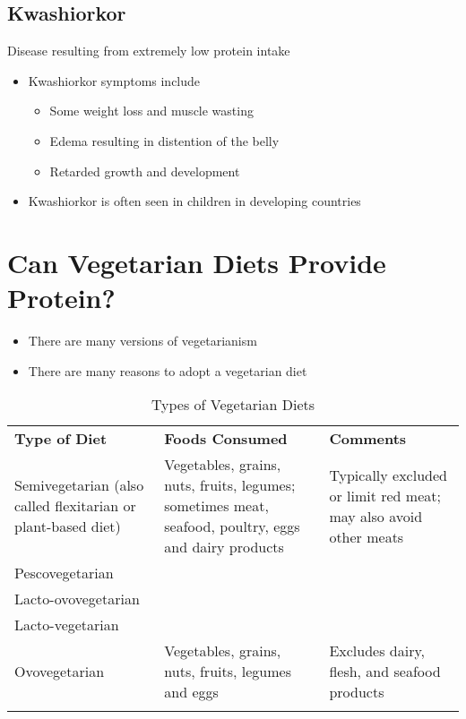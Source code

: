 \documentclass[title={Chapter 6}]{fdsn201notes}
\begin{document}
\subsection{Kwashiorkor}\label{subsec:kwashiorkor}
Disease resulting from extremely low protein intake

\begin{itemize}
	\item Kwashiorkor symptoms include
	\begin{itemize}
		\item Some weight loss and muscle wasting
		\item Edema resulting in distention of the belly
		\item Retarded growth and development
	\end{itemize}
	\item Kwashiorkor is often seen in children in developing countries
\end{itemize}

\section{Can Vegetarian Diets Provide Protein?}\label{sec:can-vegetarian-diets-provide-protein?}
\begin{itemize}
	\item There are many versions of vegetarianism
	\item There are many reasons to adopt a vegetarian diet
\end{itemize}

\begin{table}[H]
	\centering
	\caption{Types of Vegetarian Diets}
	\label{tab:types-of-vegetarian-diets}
	\begin{tabular}{p{} p{} p{}}
		\rowcolor{rowdarkgreen}%
		\textbf{Type of Diet} & \textbf{Foods Consumed} & \textbf{Comments}\\
		Semivegetarian (also called flexitarian or plant-based diet) & Vegetables, grains, nuts, fruits, legumes; sometimes meat, seafood, poultry, eggs and dairy products & Typically excluded or limit red meat; may also avoid other meats\\
		Pescovegetarian \\
		Lacto-ovovegetarian \\
		Lacto-vegetarian \\
		Ovovegetarian & Vegetables, grains, nuts, fruits, legumes and eggs & Excludes dairy, flesh, and seafood products\\
		\rowcolor{rowdarkgreen} & & \\
	\end{tabular}
\end{table}
\end{document}
